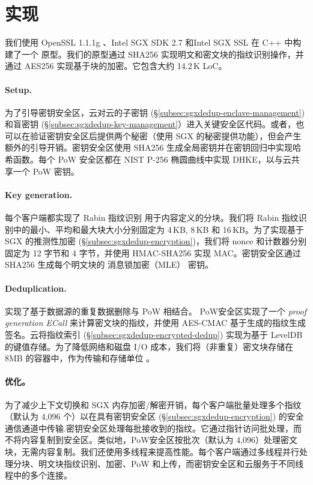 \section{实现}
\label{sec:sgxdedup-implementation}

我们使用 OpenSSL 1.1.1g \cite{openssl}、Intel SGX SDK 2.7 \cite{sgx} 和Intel SGX SSL \cite{sgxssl} 在 C++ 中构建了一个 \sysnameS 原型。我们的原型通过 SHA256 实现明文和密文块的指纹识别操作，并通过 AES256 实现基于块的加密。它包含大约 14.2\,K LoC。

\paragraph*{Setup.} 
为了引导密钥安全区，云对云的子密钥 (\S\ref{subsec:sgxdedup-enclave-management}) 和盲密钥 (\S\ref{subsec:sgxdedup-key-management}）进入关键安全区代码。或者，\sysnameS 也可以在验证密钥安全区后提供两个秘密（使用 SGX \cite{sgx} 的秘密提供功能），但会产生额外的引导开销。密钥安全区使用 SHA256 生成全局密钥并在密钥回归中实现哈希函数。每个 PoW 安全区都在 NIST P-256 椭圆曲线中实现 DHKE，以与云共享一个 PoW 密钥。

\paragraph*{Key generation.} 每个客户端都实现了 Rabin 指纹识别 \cite{rabin81} 用于内容定义的分块。我们将 Rabin 指纹识别中的最小、平均和最大块大小分别固定为 4\,KB, 8\,KB 和 16\,KB。为了实现基于 SGX 的推测性加密 (\S\ref{subsec:sgxdedup-encryption})，我们将 nonce 和计数器分别固定为 12 字节和 4 字节，并使用 HMAC-SHA256 实现 MAC。密钥安全区通过 SHA256 生成每个明文块的 消息锁加密（MLE） 密钥。

\paragraph*{Deduplication.} \sysnameS 实现了基于数据源的重复数据删除与 PoW 相结合。 PoW安全区实现了一个 \textit{ proof generation ECall} 来计算密文块的指纹，并使用 AES-CMAC 基于生成的指纹生成签名。云将指纹索引 (\S\ref{subsec:sgxdedup-encrypted-dedup}) 实现为基于 LevelDB \cite{leveldb} 的键值存储。为了降低网络和磁盘 I/O 成本，我们将（非重复）密文块存储在 8MB 的容器中，作为传输和存储单位 \cite{lillibridge13}。

\paragraph*{优化。} 为了减少上下文切换和 SGX 内存加密/解密开销，每个客户端批量处理多个指纹（默认为 4,096 个）以在具有密钥安全区 (\S\ref{subsec:sgxdedup-encryption}) 的安全通信通道中传输.密钥安全区处理每批接收到的指纹。它通过指针访问批处理，而不将内容复制到安全区\cite{harnik18}。类似地，PoW安全区按批次（默认为 4,096）处理密文块，无需内容复制。我们还使用多线程来提高性能。每个客户端通过多线程并行处理分块、明文块指纹识别、加密、PoW 和上传，而密钥安全区和云服务于不同线程中的多个连接。